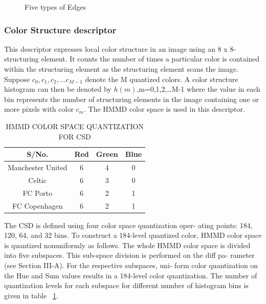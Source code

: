 \begin{itemize}
\begin{figure}[htp]
  \caption{Five types of Edges}
  \label{ehd}
\end{figure}
\end{itemize}

\subsubsection{Color Structure descriptor}
%
This descriptor expresses local color structure in an image
using an 8 x 8-structuring element. It counts the number of
times a particular color is contained within the structuring
element as the structuring element scans the image. Suppose
$c_{0},c_{1},c_{2},\ldots c_{M-1} $ denote the M quantized colors. A color
structure histogram can then be denoted by $h(m)$,m=0,1,2,\ldots M-1 where the
value in each bin represents the number of structuring elements in the image containing one
or more pixels with color $c_{m}$. The HMMD color space is used
in this descriptor.
\begin{table}[h]
\begin{tabular}{| c | c | c |c |}
\hline
S/No.              & Red &Green &Blue   \\
\hline
Manchester United & 6 & 4 & 0   \\
Celtic            & 6 & 3 & 0    \\
FC Porto           & 6 & 2 & 1   \\
FC Copenhagen     & 6 & 2 & 1  \\
\end{tabular}

\caption{ HMMD COLOR SPACE QUANTIZATION FOR CSD }
\label{HMMD-table}
\end{table}
The CSD is defined using four color space quantization oper-
ating points: 184, 120, 64, and 32 bins. To construct a 184-level
quantized color, HMMD color space is quantized nonuniformly
as follows. The whole HMMD color space is divided into five
subspaces. This sub-space division is performed on the diff pa-
rameter (see Section III-A). For the respective subspaces, uni-
form color quantization on the Hue and Sum values results in a
184-level color quantization. The number of quantization levels
for each subspace for different number of histogram bins is
given in table ~\ref{HMMD-table}. \\

